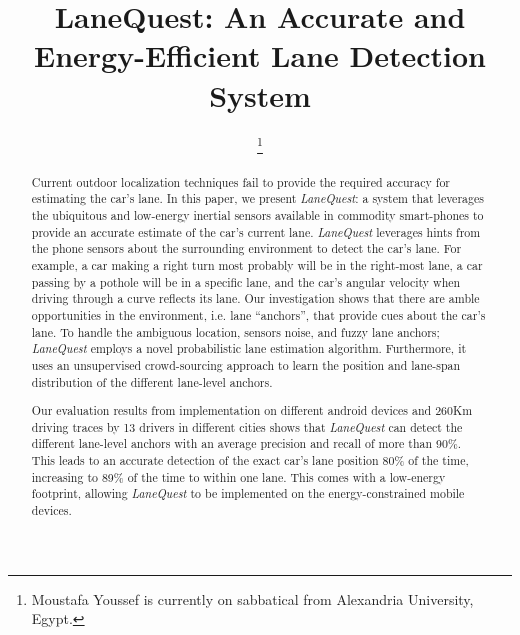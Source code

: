 \documentclass[10pt, conference, compsocconf]{IEEEtran}
\newcommand{\system}{LaneQuest}
\def \sys {\textit{LaneQuest}}
\begin{document}
\title{\system{}: An Accurate and Energy-Efficient Lane Detection System}

\author{
\and
{}
\and
{}
\thanks{Moustafa Youssef is currently on sabbatical from Alexandria University, Egypt.}
}

\maketitle
\begin{abstract}

Current outdoor localization techniques fail to provide the required accuracy for estimating the car's lane.
In this paper, we present \sys{}: a system that leverages the ubiquitous and low-energy inertial sensors available in commodity smart-phones to provide an accurate estimate of the car's current lane. \sys{} leverages hints from the phone sensors about the surrounding environment to detect the car's lane. For example, a car making a right turn most probably will be in the right-most lane, a car passing by a pothole will be in a specific lane, and the car's angular velocity when driving through a curve reflects its lane. Our investigation shows that there are amble opportunities in the environment, i.e. lane ``anchors'', that provide cues about the car's lane. To handle the ambiguous location, sensors noise, and fuzzy lane anchors;  \sys{} employs a novel probabilistic lane estimation algorithm. Furthermore, it uses an unsupervised crowd-sourcing approach to learn the position and lane-span distribution of the different lane-level anchors.

Our evaluation results from implementation on different android devices and 260Km driving traces by 13 drivers in different cities shows that \sys{} can detect the different lane-level anchors with an average precision and recall of more than 90\%. This leads to an accurate detection of the exact car's lane position 80\% of the time, increasing to 89\% of the time to within one lane. This comes with a low-energy footprint, allowing \sys{} to be implemented on the energy-constrained mobile devices.
\end{abstract}
\end{document}
